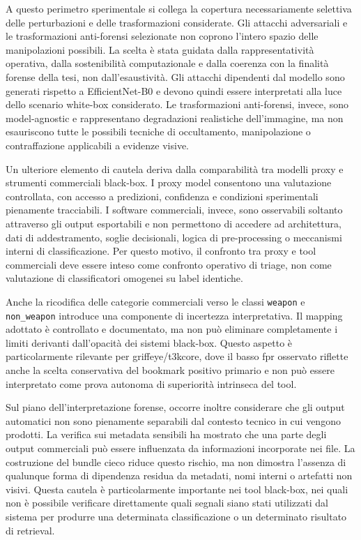 A questo perimetro sperimentale si collega la copertura necessariamente
selettiva delle perturbazioni e delle trasformazioni considerate. Gli attacchi
adversariali e le trasformazioni anti-forensi selezionate non coprono l'intero
spazio delle manipolazioni possibili. La scelta è stata guidata dalla
rappresentatività operativa, dalla sostenibilità computazionale e dalla coerenza
con la finalità forense della tesi, non dall'esaustività. Gli attacchi
dipendenti dal modello sono generati rispetto a EfficientNet-B0 e devono quindi
essere interpretati alla luce dello scenario white-box considerato. Le
trasformazioni anti-forensi, invece, sono model-agnostic e rappresentano
degradazioni realistiche dell'immagine, ma non esauriscono tutte le possibili
tecniche di occultamento, manipolazione o contraffazione applicabili a evidenze
visive.

Un ulteriore elemento di cautela deriva dalla comparabilità tra modelli proxy e
strumenti commerciali black-box. I proxy model consentono una valutazione
controllata, con accesso a predizioni, confidenza e condizioni sperimentali
pienamente tracciabili. I software commerciali, invece, sono osservabili
soltanto attraverso gli output esportabili e non permettono di accedere ad
architettura, dati di addestramento, soglie decisionali, logica di
pre-processing o meccanismi interni di classificazione. Per questo motivo, il
confronto tra proxy e tool commerciali deve essere inteso come confronto
operativo di triage, non come valutazione di classificatori omogenei su label
identiche.

Anche la ricodifica delle categorie commerciali verso le classi
\texttt{weapon} e \texttt{non\_weapon} introduce una componente di incertezza
interpretativa. Il mapping adottato è controllato e documentato, ma non può
eliminare completamente i limiti derivanti dall'opacità dei sistemi black-box.
Questo aspetto è particolarmente rilevante per \gls{griffeye}/\gls{t3kcore},
dove il basso \gls{fpr} osservato riflette anche la scelta conservativa del
bookmark positivo primario e non può essere interpretato come prova autonoma di
superiorità intrinseca del tool.

Sul piano dell'interpretazione forense, occorre inoltre considerare che gli
output automatici non sono pienamente separabili dal contesto tecnico in cui
vengono prodotti. La verifica sui metadata sensibili ha mostrato che una parte
degli output commerciali può essere influenzata da informazioni incorporate nei
file. La costruzione del bundle cieco riduce questo rischio, ma non dimostra
l'assenza di qualunque forma di dipendenza residua da metadati, nomi interni o
artefatti non visivi. Questa cautela è particolarmente importante nei tool
black-box, nei quali non è possibile verificare direttamente quali segnali siano
stati utilizzati dal sistema per produrre una determinata classificazione o un
determinato risultato di retrieval.

